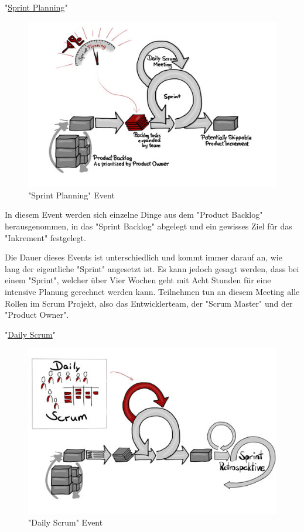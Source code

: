 \cite{Scrum}

"\underline{Sprint Planning}"

\begin{figure}[H]
    \centering
    \includegraphics[width=\textwidth]{media/ProjectManagement/SprintPlanning.jpg}
    \caption{"Sprint Planning" Event \cite{PlanningBild}}
\end{figure}

In diesem Event werden sich einzelne Dinge aus dem "Product Backlog" herausgenommen, in das "Sprint Backlog" abgelegt und ein gewisses Ziel für das "Inkrement" festgelegt.

Die Dauer dieses Events ist unterschiedlich und kommt immer darauf an, wie lang der eigentliche "Sprint" angesetzt ist. Es kann jedoch gesagt werden, dass bei einem "Sprint", welcher über Vier Wochen geht mit Acht Stunden für eine intensive Planung gerechnet werden kann. Teilnehmen tun an diesem Meeting alle Rollen im Scrum Projekt, also das Entwicklerteam, der "Scrum Master" und der "Product Owner". \cite{Planning}

"\underline{Daily Scrum}"

\begin{figure}[H]
    \centering
    \includegraphics[width=\textwidth]{media/ProjectManagement/DailyScrum.jpg}
    \caption{"Daily Scrum" Event \cite{DailyScrumBild}}
\end{figure}

